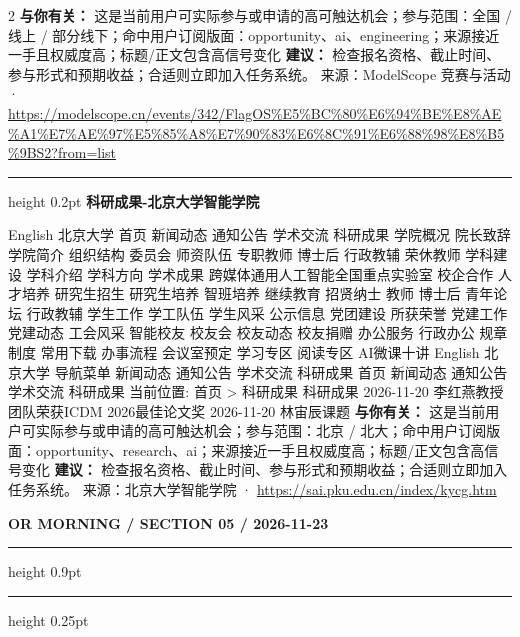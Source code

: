 \documentclass[10.5pt]{ctexart}
\begin{document}
\begin{multicols}{2}
\textbf{与你有关：} 这是当前用户可实际参与或申请的高可触达机会；参与范围：全国 / 线上 / 部分线下；命中用户订阅版面：opportunity、ai、engineering；来源接近一手且权威度高；标题/正文包含高信号变化
\textbf{建议：} 检查报名资格、截止时间、参与形式和预期收益；合适则立即加入任务系统。
{\footnotesize\color{ormuted} 来源：ModelScope 竞赛与活动 · \url{https://modelscope.cn/events/342/FlagOS%E5%BC%80%E6%94%BE%E8%AE%A1%E7%AE%97%E5%85%A8%E7%90%83%E6%8C%91%E6%88%98%E8%B5%9BS2?from=list}}
\vspace{2mm}
\hrule height 0.2pt
\vspace{2mm}
{\large\bfseries 科研成果-北京大学智能学院}\par
English 北京大学 首页 新闻动态 通知公告 学术交流 科研成果 学院概况 院长致辞 学院简介 组织结构 委员会 师资队伍 专职教师 博士后 行政教辅 荣休教师 学科建设 学科介绍 学科方向 学术成果 跨媒体通用人工智能全国重点实验室 校企合作 人才培养 研究生招生 研究生培养 智班培养 继续教育 招贤纳士 教师 博士后 青年论坛 行政教辅 学生工作 学工队伍 学生风采 公示信息 党团建设 所获荣誉 党建工作 党建动态 工会风采 智能校友 校友会 校友动态 校友捐赠 办公服务 行政办公 规章制度 常用下载 办事流程 会议室预定 学习专区 阅读专区 AI微课十讲 English 北京大学 导航菜单 新闻动态 通知公告 学术交流 科研成果 首页 新闻动态 通知公告 学术交流 科研成果 当前位置: 首页 > 科研成果 科研成果 2026-11-20 李红燕教授团队荣获ICDM 2026最佳论文奖 2026-11-20 林宙辰课题
\textbf{与你有关：} 这是当前用户可实际参与或申请的高可触达机会；参与范围：北京 / 北大；命中用户订阅版面：opportunity、research、ai；来源接近一手且权威度高；标题/正文包含高信号变化
\textbf{建议：} 检查报名资格、截止时间、参与形式和预期收益；合适则立即加入任务系统。
{\footnotesize\color{ormuted} 来源：北京大学智能学院 · \url{https://sai.pku.edu.cn/index/kycg.htm}}
\end{multicols}
\newpage
{\small\bfseries OR MORNING / SECTION 05 / 2026-11-23}
\vspace{2mm}
\hrule height 0.9pt
\vspace{1.5mm}
\hrule height 0.25pt
\vspace{4mm}
\end{document}

